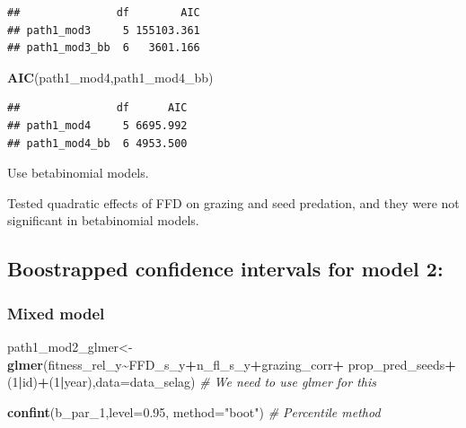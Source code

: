 \documentclass[
]{article}
\newenvironment{Shaded}{\begin{snugshade}}{\end{snugshade}}
\newcommand{\CommentTok}[1]{\textcolor[rgb]{0.56,0.35,0.01}{\textit{#1}}}
\newcommand{\DataTypeTok}[1]{\textcolor[rgb]{0.13,0.29,0.53}{#1}}
\newcommand{\DecValTok}[1]{\textcolor[rgb]{0.00,0.00,0.81}{#1}}
\newcommand{\FloatTok}[1]{\textcolor[rgb]{0.00,0.00,0.81}{#1}}
\newcommand{\KeywordTok}[1]{\textcolor[rgb]{0.13,0.29,0.53}{\textbf{#1}}}
\newcommand{\NormalTok}[1]{#1}
\newcommand{\OperatorTok}[1]{\textcolor[rgb]{0.81,0.36,0.00}{\textbf{#1}}}
\newcommand{\StringTok}[1]{\textcolor[rgb]{0.31,0.60,0.02}{#1}}
\begin{document}
\begin{verbatim}
##               df        AIC
## path1_mod3     5 155103.361
## path1_mod3_bb  6   3601.166
\end{verbatim}

\begin{Shaded}
\begin{Highlighting}[]
\KeywordTok{AIC}\NormalTok{(path1\_mod4,path1\_mod4\_bb)}
\end{Highlighting}
\end{Shaded}

\begin{verbatim}
##               df      AIC
## path1_mod4     5 6695.992
## path1_mod4_bb  6 4953.500
\end{verbatim}

Use betabinomial models.

Tested quadratic effects of FFD on grazing and seed predation, and they
were not significant in betabinomial models.

\hypertarget{boostrapped-confidence-intervals-for-model-2}{%
\subsection{Boostrapped confidence intervals for model
2:}\label{boostrapped-confidence-intervals-for-model-2}}

\hypertarget{mixed-model}{%
\subsubsection{Mixed model}\label{mixed-model}}

\begin{Shaded}
\begin{Highlighting}[]
\NormalTok{path1\_mod2\_glmer\textless{}{-}}\KeywordTok{glmer}\NormalTok{(fitness\_rel\_y}\OperatorTok{\textasciitilde{}}\NormalTok{FFD\_s\_y}\OperatorTok{+}\NormalTok{n\_fl\_s\_y}\OperatorTok{+}\NormalTok{grazing\_corr}\OperatorTok{+}
\StringTok{                          }\NormalTok{prop\_pred\_seeds}\OperatorTok{+}\NormalTok{(}\DecValTok{1}\OperatorTok{|}\NormalTok{id)}\OperatorTok{+}\NormalTok{(}\DecValTok{1}\OperatorTok{|}\NormalTok{year),}\DataTypeTok{data=}\NormalTok{data\_selag)}
\CommentTok{\# We need to use glmer for this}
\end{Highlighting}
\end{Shaded}

\begin{Shaded}
\begin{Highlighting}[]
\KeywordTok{confint}\NormalTok{(b\_par\_}\DecValTok{1}\NormalTok{,}\DataTypeTok{level=}\FloatTok{0.95}\NormalTok{, }\DataTypeTok{method=}\StringTok{"boot"}\NormalTok{) }\CommentTok{\# Percentile method}
\end{Highlighting}
\end{Shaded}
\end{document}
